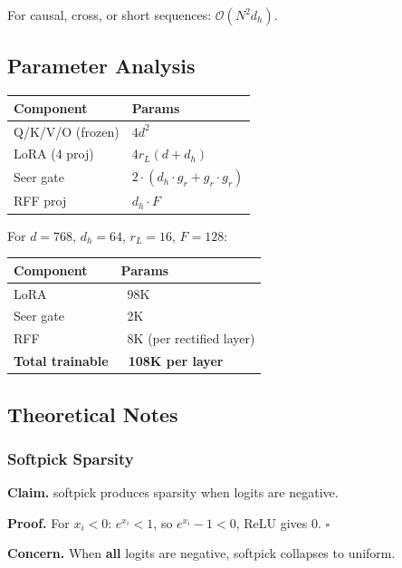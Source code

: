 For causal, cross, or short sequences: $\mathcal{O}(N^2 d_h)$.

\subsection{Parameter Analysis}

\begin{table}[H]
\centering
\small
\begin{tabular}{ll}
\toprule
\textbf{Component} & \textbf{Params} \\
\midrule
Q/K/V/O (frozen) & $4 d^2$ \\
LoRA (4 proj) & $4 r_L (d + d_h)$ \\
Seer gate & $2 \cdot (d_h \cdot g_r + g_r \cdot g_r)$ \\
RFF proj & $d_h \cdot F$ \\
\bottomrule
\end{tabular}
\end{table}

For $d = 768$, $d_h = 64$, $r_L = 16$, $F = 128$:

\begin{table}[H]
\centering
\small
\begin{tabular}{ll}
\toprule
\textbf{Component} & \textbf{Params} \\
\midrule
LoRA & ~98K \\
Seer gate & ~2K \\
RFF & ~8K (per rectified layer) \\
\textbf{Total trainable} & \textbf{~108K per layer} \\
\bottomrule
\end{tabular}
\end{table}

\subsection{Theoretical Notes}

\subsubsection{Softpick Sparsity}

\textbf{Claim.} softpick produces sparsity when logits are negative.

\textbf{Proof.} For $x_i < 0$: $e^{x_i} < 1$, so $e^{x_i} - 1 < 0$, ReLU gives 0. $\square$

\textbf{Concern.} When \textbf{all} logits are negative, softpick collapses to uniform.

